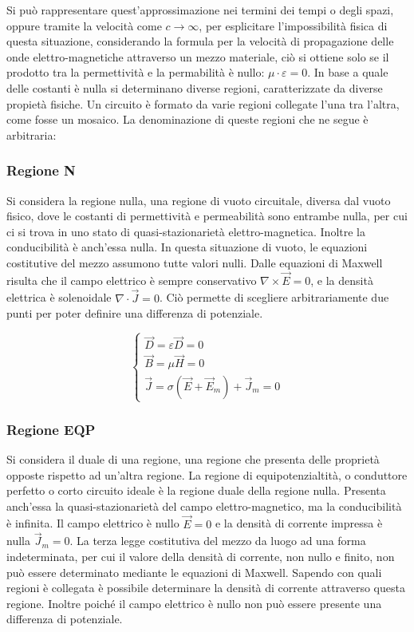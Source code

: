 \documentclass{article}
\numberwithin{equation}{subsection}
\begin{document}
Si può rappresentare quest'approssimazione 
nei termini dei tempi o degli spazi, oppure tramite la velocità come $c\to\infty$, per 
esplicitare l'impossibilità fisica di questa situazione, considerando la formula per la velocità di propagazione delle onde elettro-magnetiche attraverso un mezzo materiale, 
ciò si ottiene solo se il prodotto tra la permettività e la permabilità è nullo: $\mu\cdot\varepsilon=0$. In base a quale delle costanti è nulla si determinano diverse 
regioni, caratterizzate da diverse propietà fisiche. Un circuito è formato da varie regioni collegate l'una tra l'altra, come fosse un mosaico. 
La denominazione di queste regioni che ne segue è arbitraria:

\subsubsection{Regione N}
Si considera la regione nulla, una regione di vuoto circuitale, diversa dal vuoto fisico, dove le costanti di permettività e permeabilità sono entrambe nulla, per cui ci si 
trova in uno stato di quasi-stazionarietà elettro-magnetica. Inoltre la conducibilità è anch'essa nulla. In questa situazione di vuoto, le equazioni costitutive del mezzo 
assumono tutte valori nulli. Dalle equazioni di Maxwell risulta che il campo elettrico è sempre conservativo $\nabla\times\vec{E}=0$, e la densità elettrica è solenoidale $\nabla\cdot\vec{J}=0$. 
Ciò permette di scegliere arbitrariamente due punti per poter definire una differenza di potenziale. 

\begin{equation*}
    \begin{cases}
        \vec{D}=\varepsilon\vec{D}=0\\
        \vec{B}=\mu\vec{H}=0\\
        \vec{J}=\sigma(\vec{E}+\vec{E}_m)+\vec{J}_m=0
    \end{cases}
\end{equation*}

\subsubsection{Regione EQP}
Si considera il duale di una regione, una regione che presenta delle proprietà opposte rispetto ad un'altra regione. La regione di equipotenzialtità, o conduttore perfetto o 
corto circuito ideale è la regione duale della regione nulla. Presenta anch'essa la quasi-stazionarietà del campo elettro-magnetico, ma la conducibilità è infinita. Il campo 
elettrico è nullo $\vec{E}=0$ e la densità di corrente impressa è nulla $\vec{J}_m=0$. La terza legge costitutiva del mezzo da 
luogo ad una forma indeterminata, per cui il valore della densità di corrente, non nullo e finito, non può essere determinato mediante le equazioni di Maxwell. Sapendo con 
quali regioni è collegata è possibile determinare la densità di corrente attraverso questa regione. Inoltre poiché il campo elettrico è nullo non può essere presente 
una differenza di potenziale. 
\end{document}
